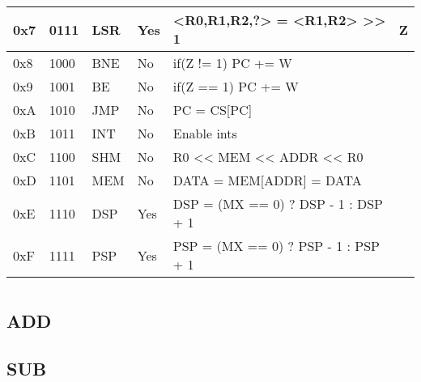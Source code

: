 \documentclass[a4paper]{article}
\begin{document}
\begin{table}[]
\begin{tabular}{|l|l|l|l|l|l|}
        0x7                 &   0111            &   LSR                 &   Yes                 &   <R0,R1,R2,?> = <R1,R2> >> 1             &   Z                       \\ \hline  
        0x8                 &   1000            &   BNE                 &   No                  &   if(Z != 1) PC += W                      &                           \\ \hline  
        0x9                 &   1001            &   BE                  &   No                  &   if(Z == 1) PC += W                      &                           \\ \hline  
        0xA                 &   1010            &   JMP                 &   No                  &   PC = CS[PC]                             &                           \\ \hline  
        0xB                 &   1011            &   INT                 &   No                  &   Enable ints                             &                           \\ \hline  
        0xC                 &   1100            &   SHM                 &   No                  &   R0 << MEM << ADDR << R0                 &                           \\ \hline  
        0xD                 &   1101            &   MEM                 &   No                  &   DATA = MEM[ADDR] = DATA                 &                           \\ \hline  
        0xE                 &   1110            &   DSP                 &   Yes                 &   DSP = (MX == 0) ? DSP - 1 : DSP + 1     &                           \\ \hline  
        0xF                 &   1111            &   PSP                 &   Yes                 &   PSP = (MX == 0) ? PSP - 1 : PSP + 1     &                           \\ \hline  
    \end{tabular}
\end{table}


\section{}

\subsection{ADD}

\subsection{SUB}
\end{document}
